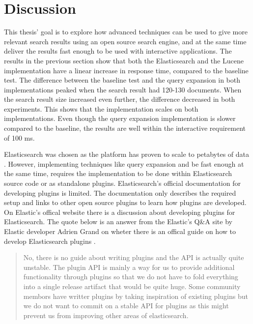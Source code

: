 \section{Discussion}
\label{sec:discussion}
This thesis' goal is to explore how advanced techniques can be used to give more relevant search results using an open source search engine,
and at the same time deliver the results fast enough to be used with interactive applications.
The results in the previous section show that both the Elasticsearch and the Lucene implementation have a linear increase in response time,
compared to the baseline test.
The difference between the baseline test and the query expansion in both implementations peaked when the search result had 120-130 documents.
When the search result size increased even further, the difference decreased in both experiments.
This shows that the implementation scales on both implementations.
Even though the query expansion implementation is slower compared to the baseline,
the results are well within the interactive requirement of 100 ms.

Elasticsearch was chosen as the platform has proven to scale to petabytes of data \cite{elasticsearch-scale}.
However,
implementing techniques like query expansion and be fast enough at the same time,
requires the implementation to be done within Elasticsearch source code or as standalone plugins.
Elasticsearch's official documentation \cite{elasticsearch-plugin-documentation} for developing plugins is limited.
The documentation only describes the required setup and links to other open source plugins to learn how plugins are developed.
On Elastic's offical website there is a discussion about developing plugins for Elasticsearch.
The quote below is an answer from the Elastic's Q\&A site by Elastic developer Adrien Grand on wheter there is an offical guide on how to develop Elasticsearch plugins \cite{elasticsearch-plugin-quote}.

\begin{quote}
  No, there is no guide about writing plugins and the API is actually quite unstable.
  The plugin API is mainly a way for us to provide additional functionality through plugins so that we do not have to fold everything into a single release artifact that would be quite huge.
  Some community membors have writter plugins by taking inspiration of existing plugins but we do not want to commit on a stable API for plugins as this might prevent us from improving other areas of elasticsearch.
\end{quote}

